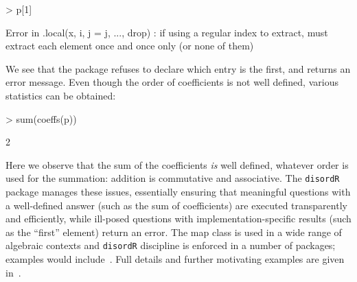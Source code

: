 \documentclass{birkjour}
\theoremstyle{definition}
\theoremstyle{remark}
\numberwithin{equation}{section}
\renewenvironment{Schunk}{\vspace{20pt}}{\vspace{20pt}}
\begin{document}
\begin{Schunk}
\begin{Sinput}
> p[1]
\end{Sinput}
\begin{Soutput}
Error in .local(x, i, j = j, ..., drop) : 
   if using a regular index to extract, must extract each
   element once and once only (or none of them)
\end{Soutput}
\end{Schunk}
%
We see that the package refuses to declare which entry is the first,
and returns an error message.  Even though the order of coefficients
is not well defined, various statistics can be obtained:
%
\begin{Schunk}
\begin{Sinput}
> sum(coeffs(p))
\end{Sinput}
\begin{Soutput}
[1]  2
\end{Soutput}
\end{Schunk}
%
Here we observe that the sum of the coefficients {\em is} well
defined, whatever order is used for the summation: addition is
commutative and associative.  The {\tt disordR} package manages these
issues, essentially ensuring that meaningful questions with a
well-defined answer (such as the sum of coefficients) are executed
transparently and efficiently, while ill-posed questions with
implementation-specific results (such as the ``first'' element) return
an error.  The map class is used in a wide range of algebraic contexts
and {\tt disordR} discipline is enforced in a number of packages;
examples would
include~\cite{hankin2017_hyper2,hankin2023_frab,hankin2024_evitaicossa}.
Full details and further motivating examples are given
in~\cite{hankin2022_disordR}.
\end{document}
